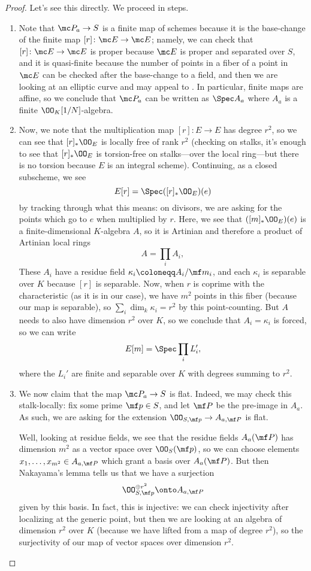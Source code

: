 \documentclass[../notes.tex]{subfiles}
\begin{document}
\begin{proof}
	Let's see this directly. We proceed in steps.
	\begin{enumerate}
		\item Note that $\mc P_a\to S$ is a finite map of schemes because it is the base-change of the finite map $[r]\colon\mc E\to\mc E$; namely, we can check that $[r]\colon\mc E\to\mc E$ is proper because $\mc E$ is proper and separated over $S$, and it is quasi-finite because the number of points in a fiber of a point in $\mc E$ can be checked after the base-change to a field, and then we are looking at an elliptic curve and may appeal to . In particular, finite maps are affine, so we conclude that $\mc P_a$ can be written as $\Spec A_a$ where $A_a$ is a finite $\OO_K[1/N]$-algebra.

		\item Now, we note that the multiplication map $[r]\colon E\to E$ has degree $r^2$, so we can see that $[r]_*\OO_E$ is locally free of rank $r^2$ (checking on stalks, it's enough to see that $[r]_*\OO_E$ is torsion-free on stalks---over the local ring---but there is no torsion because $E$ is an integral scheme). Continuing, as a closed subscheme, we see
		\[E[r]=\Spec([r]_*\OO_E)(e)\]
		by tracking through what this means: on divisors, we are asking for the points which go to $e$ when multiplied by $r$. Here, we see that $([m]_*\OO_E)(e)$ is a finite-dimensional $K$-algebra $A$, so it is Artinian and therefore a product of Artinian local rings
		\[A=\prod_iA_i,\]
		These $A_i$ have a residue field $\kappa_i\coloneqq A_i/\mf m_i$, and each $\kappa_i$ is separable over $K$ because $[r]$ is separable. Now, when $r$ is coprime with the characteristic (as it is in our case), we have $m^2$ points in this fiber (because our map is separable), so $\sum_i\dim_k\kappa_i=r^2$ by this point-counting. But $A$ needs to also have dimension $r^2$ over $K$, so we conclude that $A_i=\kappa_i$ is forced, so we can write
		\[E[m]=\Spec\prod_iL_i',\]
		where the $L_i'$ are finite and separable over $K$ with degrees summing to $r^2$.

		\item We now claim that the map $\mc P_a\to S$ is flat. Indeed, we may check this stalk-locally: fix some prime $\mf p\in S$, and let $\mf P$ be the pre-image in $A_a$. As such, we are asking for the extension $\OO_{S,\mf p}\to A_{a,\mf P}$ is flat.

		Well, looking at residue fields, we see that the residue fields $A_a(\mf P)$ has dimension $m^2$ as a vector space over $\OO_S(\mf p)$, so we can choose elements $x_1,\ldots,x_{m^2}\in A_{a,\mf P}$ which grant a basis over $A_a(\mf P)$. But then Nakayama's lemma tells us that we have a surjection
		\[\OO_{S,\mf p}^{\oplus r^2}\onto A_{a,\mf P}\]
		given by this basis. In fact, this is injective: we can check injectivity after localizing at the generic point, but then we are looking at an algebra of dimension $r^2$ over $K$ (because we have lifted from a map of degree $r^2$), so the surjectivity of our map of vector spaces over dimension $r^2$.


\end{enumerate}
\end{proof}
\end{document}
